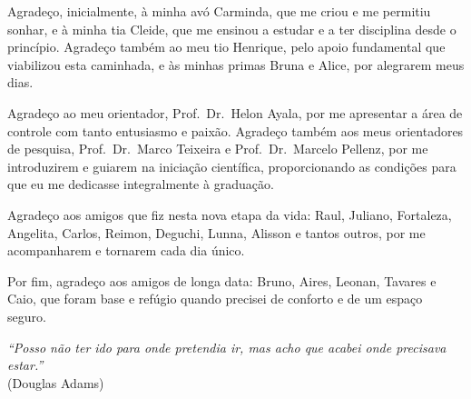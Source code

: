 \begin{agradecimentos}

Agradeço, inicialmente, à minha avó Carminda, que me criou e me permitiu sonhar, e à minha tia Cleide, que me ensinou a estudar e a ter disciplina desde o princípio. Agradeço também ao meu tio Henrique, pelo apoio fundamental que viabilizou esta caminhada, e às minhas primas Bruna e Alice, por alegrarem meus dias.

Agradeço ao meu orientador, Prof.~Dr.~Helon Ayala, por me apresentar a área de controle com tanto entusiasmo e paixão. Agradeço também aos meus orientadores de pesquisa, Prof.~Dr.~Marco Teixeira e Prof.~Dr.~Marcelo Pellenz, por me introduzirem e guiarem na iniciação científica, proporcionando as condições para que eu me dedicasse integralmente à graduação.

Agradeço aos amigos que fiz nesta nova etapa da vida: Raul, Juliano, Fortaleza, Angelita, Carlos, Reimon, Deguchi, Lunna, Alisson e tantos outros, por me acompanharem e tornarem cada dia único.

Por fim, agradeço aos amigos de longa data: Bruno, Aires, Leonan, Tavares e Caio, que foram base e refúgio quando precisei de conforto e de um espaço seguro.

\end{agradecimentos}




\begin{epigrafe}
    \vspace*{\fill}
    \begin{flushright}
        \begin{minipage}{8.5cm}
            \raggedleft
            \textit{``Posso não ter ido para onde pretendia ir, mas acho que acabei onde precisava estar.''}\\
            \vspace{0.5ex}
            (Douglas Adams)
        \end{minipage}
    \end{flushright}
\end{epigrafe}


